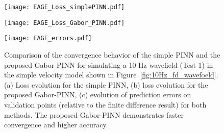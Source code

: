 \documentclass[authoryear, preprint, 12pt]{elsarticle}
\begin{document}
\begin{figure}[tp]
\centering
\begin{minipage}{0.32\textwidth}
	\centering
	\texttt{[image: EAGE\_Loss\_simplePINN.pdf]}
\end{minipage}
\begin{minipage}{0.32\textwidth}
	\centering
	\texttt{[image: EAGE\_Loss\_Gabor\_PINN.pdf]}
\end{minipage}
\begin{minipage}{0.32\textwidth}
	\centering
	\texttt{[image: EAGE\_errors.pdf]}
\end{minipage}

\caption{Comparison of the convergence behavior of the simple PINN and the proposed Gabor-PINN for simulating a 10 Hz wavefield (Test 1) in the simple velocity model shown in Figure~\ref{fig:10Hz_fd_wavefoeld}. (a) Loss evolution for the simple PINN, (b) loss evolution for the proposed Gabor-PINN, (c) evolution of prediction errors on validation points (relative to the finite difference result) for both methods. The proposed Gabor-PINN demonstrates faster convergence and higher accuracy.}
\label{fig:loss_10Hz}
\end{figure}
	
\end{document}
